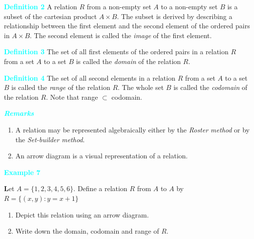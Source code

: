 \documentclass[11pt]{article}
\begin{document}
\vspace{0.8em}

\vspace{0.8em}

\noindent
\colorbox{ncertblue}{\textcolor{cyan}{\textbf{Definition 2}}}\hspace{0.5em}
A relation $R$ from a non-empty set $A$ to a non-empty set $B$ is a subset of
the cartesian product $A \times B$. The subset is derived by describing a
relationship between the first element and the second element of the ordered
pairs in $A \times B$. The second element is called the \textit{image} of the
first element.

\vspace{0.6em}
\noindent
\colorbox{ncertblue}{\textcolor{cyan}{\textbf{Definition 3}}}\hspace{0.5em}
The set of all first elements of the ordered pairs in a relation $R$ from a set
$A$ to a set $B$ is called the \textit{domain} of the relation $R$.

\vspace{0.6em}
\noindent
\colorbox{ncertblue}{\textcolor{cyan}{\textbf{Definition 4}}}\hspace{0.5em}
The set of all second elements in a relation $R$ from a set $A$ to a set $B$ is
called the \textit{range} of the relation $R$. The whole set $B$ is called the
\textit{codomain} of the relation $R$. Note that range $\subset$ codomain.

\vspace{0.6em}
\noindent
\colorbox{ncertblue}{\textcolor{cyan}{\textbf{\textit{Remarks}}}}

\begin{enumerate}
\item A relation may be represented algebraically either by the
\textit{Roster method} or by the \textit{Set-builder method}.
\item An arrow diagram is a visual representation of a relation.
\end{enumerate}

\noindent\textcolor{cyan}{\textbf{Example 7}}

\textbf Let $A=\{1,2,3,4,5,6\}$. Define a relation $R$ from $A$ to $A$ by 
$R=\{(x,y):y=x+1\}$
\begin{enumerate}
    \item[(i)] Depict this relation using an arrow diagram.
    \item[(ii)] Write down the domain, codomain and range of $R$.
\end{enumerate}
\end{document}
